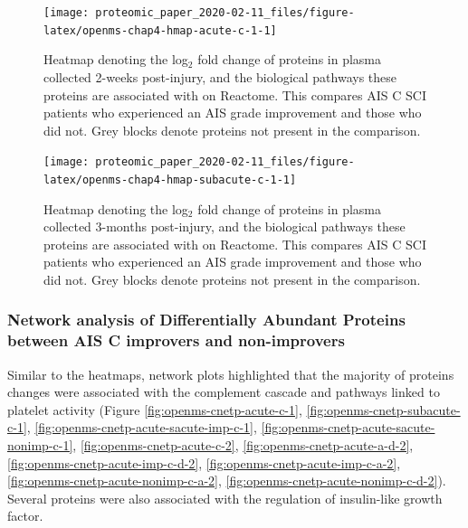 \documentclass[9pt,lineno]{elife}
\begin{document}
\begin{landscape}



\begin{figure}

{\centering \texttt{[image: proteomic\_paper\_2020-02-11\_files/figure-latex/openms-chap4-hmap-acute-c-1-1]} 

}

\caption{Heatmap denoting the log\(_2\) fold change of proteins in plasma collected 2-weeks post-injury, and the biological pathways these proteins are associated with on Reactome. This compares AIS C SCI patients who experienced an AIS grade improvement and those who did not. Grey blocks denote proteins not present in the comparison.}\label{fig:openms-chap4-hmap-acute-c-1}
\end{figure}

\end{landscape}
\begin{landscape}



\begin{figure}

{\centering \texttt{[image: proteomic\_paper\_2020-02-11\_files/figure-latex/openms-chap4-hmap-subacute-c-1-1]} 

}

\caption{Heatmap denoting the log\(_2\) fold change of proteins in plasma collected 3-months post-injury, and the biological pathways these proteins are associated with on Reactome. This compares AIS C SCI patients who experienced an AIS grade improvement and those who did not. Grey blocks denote proteins not present in the comparison.}\label{fig:openms-chap4-hmap-subacute-c-1}
\end{figure}

\end{landscape}
\clearpage

\hypertarget{cnetplot-chap3}{%
\subsubsection{Network analysis of Differentially Abundant Proteins between AIS C improvers and non-improvers}\label{cnetplot-chap3}}

Similar to the heatmaps, network plots highlighted that the majority of proteins changes were associated with the complement cascade and pathways linked to platelet activity (Figure \ref{fig:openms-cnetp-acute-c-1}, \ref{fig:openms-cnetp-subacute-c-1}, \ref{fig:openms-cnetp-acute-sacute-imp-c-1}, \ref{fig:openms-cnetp-acute-sacute-nonimp-c-1}, \ref{fig:openms-cnetp-acute-c-2}, \ref{fig:openms-cnetp-acute-a-d-2}, \ref{fig:openms-cnetp-acute-imp-c-d-2}, \ref{fig:openms-cnetp-acute-imp-c-a-2}, \ref{fig:openms-cnetp-acute-nonimp-c-a-2}, \ref{fig:openms-cnetp-acute-nonimp-c-d-2}).
Several proteins were also associated with the regulation of insulin-like growth factor.
\end{document}
